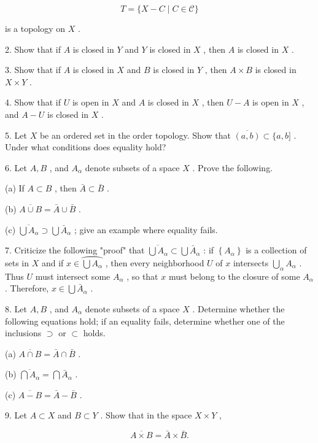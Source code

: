 \[
T = \{ X - C \mid  C \in  \mathcal{C}\}
\]

is a topology on \(X\) .

2. Show that if \(A\) is closed in \(Y\) and \(Y\) is closed in \(X\) , then \(A\) is closed in \(X\) .

3. Show that if \(A\) is closed in \(X\) and \(B\) is closed in \(Y\) , then \(A \times  B\) is closed in \(X \times  Y\) .

4. Show that if \(U\) is open in \(X\) and \(A\) is closed in \(X\) , then \(U - A\) is open in \(X\) , and \(A - U\) is closed in \(X\) .

5. Let \(X\) be an ordered set in the order topology. Show that \(\overline{\left( a,b\right) } \subset  \{ a,b\rbrack\) . Under what conditions does equality hold?

6. Let \(A,B\) , and \({A}_{\alpha }\) denote subsets of a space \(X\) . Prove the following.

(a) If \(A \subset  B\) , then \(\bar{A} \subset  \bar{B}\) .

(b) \(\overline{A \cup  B} = \bar{A} \cup  \bar{B}\) .

(c) \(\overline{\bigcup {A}_{\alpha }} \supset  \bigcup {\bar{A}}_{\alpha }\) ; give an example where equality fails.

7. Criticize the following "proof" that \(\overline{\bigcup {A}_{\alpha }} \subset  \bigcup {\bar{A}}_{\alpha }\) : if \(\left\{  {A}_{\alpha }\right\}\) is a collection of sets in \(X\) and if \(x \in  \overset{⏜}{\bigcup {A}_{\alpha }}\) , then every neighborhood \(U\) of \(x\) intersects \(\mathop{\bigcup }\limits_{\alpha }{A}_{\alpha }\) . Thus \(U\) must intersect some \({A}_{\alpha }\) , so that \(x\) must belong to the closure of some \({A}_{\alpha }\) . Therefore, \(x \in  \bigcup {\bar{A}}_{\alpha }\) .

8. Let \(A,B\) , and \({A}_{\alpha }\) denote subsets of a space \(X\) . Determine whether the following equations hold; if an equality fails, determine whether one of the inclusions \(\supset\) or \(\subset\) holds.

(a) \(\overline{A \cap  B} = \bar{A} \cap  \bar{B}\) .

(b) \(\overline{\bigcap {A}_{\alpha }} = \bigcap {\bar{A}}_{\alpha }\) .

(c) \(\overline{A - B} = \bar{A} - \bar{B}\) .

9. Let \(A \subset  X\) and \(B \subset  Y\) . Show that in the space \(X \times  Y\) ,

\[
\overline{A \times  B} = \bar{A} \times  \bar{B}.
\]

